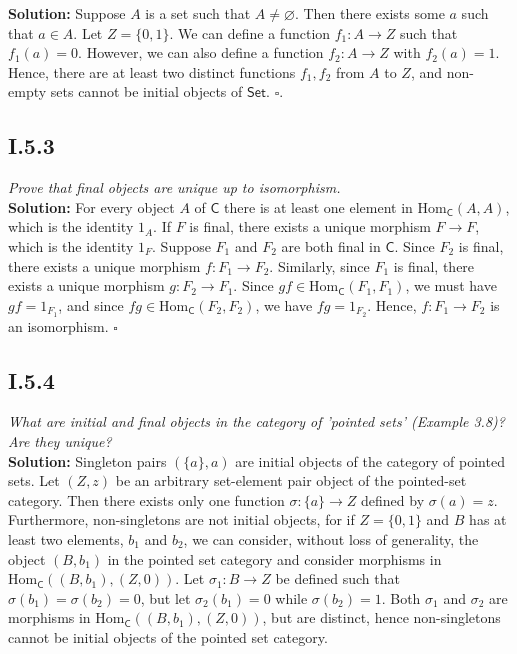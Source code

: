 \documentclass[11pt,a4paper]{article}
\newcommand{\morph}[3]{\text{Hom}_{#1}(#2,#3)}
\begin{document}
\noindent \textbf{Solution: } Suppose $A$ is a set such that $A \neq \varnothing$.  Then there exists some $a$ such that $a \in A$.  Let $Z = \{0,1\}$.  We can define a function $f_1:A \rightarrow Z$ such that $f_1(a) = 0$.  However, we can also define a function $f_2:A\rightarrow Z$ with $f_2(a) = 1$.  Hence, there are at least two distinct functions $f_1,f_2$ from $A$ to $Z$, and non-empty sets cannot be initial objects of $\textsf{Set}$. $\square$.

\subsection*{I.5.3} \textit{Prove that final objects are unique up to isomorphism.} \\

\noindent \textbf{Solution: } For every object $A$ of $\textsf{C}$ there is at least one element in $\morph{\textsf{C}}{A}{A}$, which is the identity $1_A$.  If $F$ is final, there exists a unique morphism $F \rightarrow F$, which is the identity $1_F$.  Suppose $F_1$ and $F_2$ are both final in $\textsf{C}$.  Since $F_2$ is final, there exists a unique morphism $f: F_1 \rightarrow F_2$.  Similarly, since $F_1$ is final, there exists a unique morphism $g: F_2 \rightarrow F_1$.  Since $gf \in \morph{\textsf{C}}{F_1}{F_1}$, we must have $gf = 1_{F_1}$, and since $fg \in \morph{\textsf{C}}{F_2}{F_2}$, we have $fg = 1_{F_2}$.  Hence, $f: F_1 \rightarrow F_2$ is an isomorphism. $\square$

\subsection*{I.5.4} \textit{What are initial and final objects in the category of 'pointed sets' (Example 3.8)?  Are they unique?} \\

\noindent \textbf{Solution: } Singleton pairs $(\{a\},a)$ are initial objects of the category of pointed sets.  Let $(Z,z)$ be an arbitrary set-element pair object of the pointed-set category.  Then there exists only one function $\sigma:\{a\}\rightarrow Z$ defined by $\sigma(a) = z$.  Furthermore, non-singletons are not initial objects, for if $Z =\{0,1\}$ and $B$ has at least two elements, $b_1$ and $b_2$, we can consider, without loss of generality, the object $(B,b_1)$ in the pointed set category and consider morphisms in $\morph{\textsf{C}}{(B,b_1)}{(Z,0)}$.  Let $\sigma_1:B \rightarrow Z$ be defined such that $\sigma(b_1) = \sigma(b_2) = 0$, but let $\sigma_2(b_1) = 0$ while $\sigma(b_2) = 1$.  Both $\sigma_1$ and $\sigma_2$ are morphisms in $\morph{\textsf{C}}{(B,b_1)}{(Z,0)}$, but are distinct, hence non-singletons cannot be initial objects of the pointed set category. \\
\end{document}
